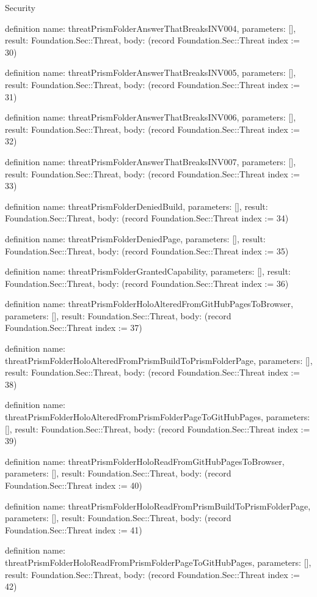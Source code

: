 \begin{lexlean}{Security}
\begin{semanticmodule}
definition{
  name: threatPrismFolderAnswerThatBreaksINV004,
  parameters: [],
  result: Foundation.Sec::Threat,
  body: (record Foundation.Sec::Threat {index := 30})
}

definition{
  name: threatPrismFolderAnswerThatBreaksINV005,
  parameters: [],
  result: Foundation.Sec::Threat,
  body: (record Foundation.Sec::Threat {index := 31})
}

definition{
  name: threatPrismFolderAnswerThatBreaksINV006,
  parameters: [],
  result: Foundation.Sec::Threat,
  body: (record Foundation.Sec::Threat {index := 32})
}

definition{
  name: threatPrismFolderAnswerThatBreaksINV007,
  parameters: [],
  result: Foundation.Sec::Threat,
  body: (record Foundation.Sec::Threat {index := 33})
}

definition{
  name: threatPrismFolderDeniedBuild,
  parameters: [],
  result: Foundation.Sec::Threat,
  body: (record Foundation.Sec::Threat {index := 34})
}

definition{
  name: threatPrismFolderDeniedPage,
  parameters: [],
  result: Foundation.Sec::Threat,
  body: (record Foundation.Sec::Threat {index := 35})
}

definition{
  name: threatPrismFolderGrantedCapability,
  parameters: [],
  result: Foundation.Sec::Threat,
  body: (record Foundation.Sec::Threat {index := 36})
}

definition{
  name: threatPrismFolderHoloAlteredFromGitHubPagesToBrowser,
  parameters: [],
  result: Foundation.Sec::Threat,
  body: (record Foundation.Sec::Threat {index := 37})
}

definition{
  name: threatPrismFolderHoloAlteredFromPrismBuildToPrismFolderPage,
  parameters: [],
  result: Foundation.Sec::Threat,
  body: (record Foundation.Sec::Threat {index := 38})
}

definition{
  name: threatPrismFolderHoloAlteredFromPrismFolderPageToGitHubPages,
  parameters: [],
  result: Foundation.Sec::Threat,
  body: (record Foundation.Sec::Threat {index := 39})
}

definition{
  name: threatPrismFolderHoloReadFromGitHubPagesToBrowser,
  parameters: [],
  result: Foundation.Sec::Threat,
  body: (record Foundation.Sec::Threat {index := 40})
}

definition{
  name: threatPrismFolderHoloReadFromPrismBuildToPrismFolderPage,
  parameters: [],
  result: Foundation.Sec::Threat,
  body: (record Foundation.Sec::Threat {index := 41})
}

definition{
  name: threatPrismFolderHoloReadFromPrismFolderPageToGitHubPages,
  parameters: [],
  result: Foundation.Sec::Threat,
  body: (record Foundation.Sec::Threat {index := 42})
}


\end{semanticmodule}
\end{lexlean}
